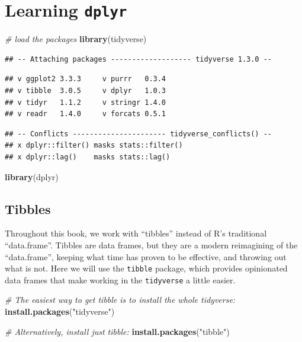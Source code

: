 \documentclass[]{book}
\newenvironment{Shaded}{\begin{snugshade}}{\end{snugshade}}
\newcommand{\KeywordTok}[1]{\textcolor[rgb]{0.13,0.29,0.53}{\textbf{#1}}}
\newcommand{\StringTok}[1]{\textcolor[rgb]{0.31,0.60,0.02}{#1}}
\newcommand{\CommentTok}[1]{\textcolor[rgb]{0.56,0.35,0.01}{\textit{#1}}}
\newcommand{\NormalTok}[1]{#1}
\begin{document}
\section{\texorpdfstring{Learning
\texttt{dplyr}}{Learning dplyr}}\label{learning-dplyr}

\begin{Shaded}
\begin{Highlighting}[]
\CommentTok{# load the packages}
\KeywordTok{library}\NormalTok{(tidyverse)}
\end{Highlighting}
\end{Shaded}

\begin{verbatim}
## -- Attaching packages ------------------- tidyverse 1.3.0 --
\end{verbatim}

\begin{verbatim}
## v ggplot2 3.3.3     v purrr   0.3.4
## v tibble  3.0.5     v dplyr   1.0.3
## v tidyr   1.1.2     v stringr 1.4.0
## v readr   1.4.0     v forcats 0.5.1
\end{verbatim}

\begin{verbatim}
## -- Conflicts ---------------------- tidyverse_conflicts() --
## x dplyr::filter() masks stats::filter()
## x dplyr::lag()    masks stats::lag()
\end{verbatim}

\begin{Shaded}
\begin{Highlighting}[]
\KeywordTok{library}\NormalTok{(dplyr)}
\end{Highlighting}
\end{Shaded}

\subsection{Tibbles}\label{tibbles}

Throughout this book, we work with ``tibbles'' instead of R's
traditional ``data.frame''. Tibbles are data frames, but they are a
modern reimagining of the ``data.frame'', keeping what time has proven
to be effective, and throwing out what is not. Here we will use the
\texttt{tibble} package, which provides opinionated data frames that
make working in the \texttt{tidyverse} a little easier.

\begin{Shaded}
\begin{Highlighting}[]
\CommentTok{# The easiest way to get tibble is to install the whole tidyverse:}
 \KeywordTok{install.packages}\NormalTok{(}\StringTok{"tidyverse"}\NormalTok{)}

\CommentTok{# Alternatively, install just tibble:}
\KeywordTok{install.packages}\NormalTok{(}\StringTok{"tibble"}\NormalTok{)}
\end{Highlighting}
\end{Shaded}
\end{document}
